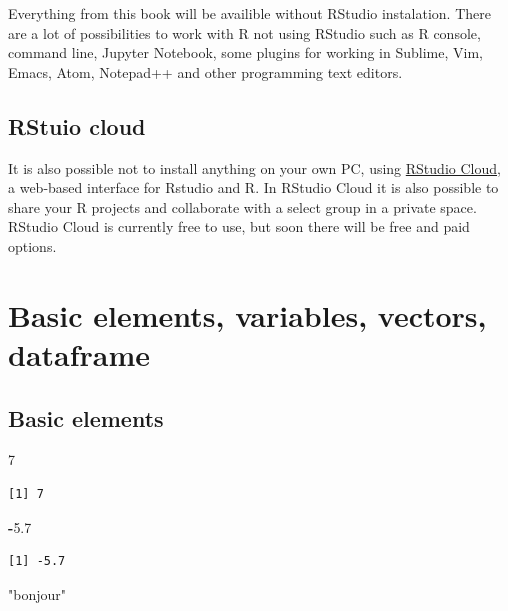 \documentclass[]{book}
\newenvironment{Shaded}{\begin{snugshade}}{\end{snugshade}}
\newcommand{\DecValTok}[1]{\textcolor[rgb]{0.00,0.00,0.81}{#1}}
\newcommand{\FloatTok}[1]{\textcolor[rgb]{0.00,0.00,0.81}{#1}}
\newcommand{\StringTok}[1]{\textcolor[rgb]{0.31,0.60,0.02}{#1}}
\newcommand{\OperatorTok}[1]{\textcolor[rgb]{0.81,0.36,0.00}{\textbf{#1}}}
\theoremstyle{definition}
\theoremstyle{definition}
\theoremstyle{definition}
\theoremstyle{remark}
\begin{document}
Everything from this book will be availible without RStudio instalation.
There are a lot of possibilities to work with R not using RStudio such
as R console, command line, Jupyter Notebook, some plugins for working
in Sublime, Vim, Emacs, Atom, Notepad++ and other programming text
editors.

\subsection{RStuio cloud}\label{rstuio-cloud}

It is also possible not to install anything on your own PC, using
\href{https://rstudio.cloud/}{RStudio Cloud}, a web-based interface for
Rstudio and R. In RStudio Cloud it is also possible to share your R
projects and collaborate with a select group in a private space. RStudio
Cloud is currently free to use, but soon there will be free and paid
options.

\section{Basic elements, variables, vectors,
dataframe}\label{basic-elements-variables-vectors-dataframe}

\subsection{Basic elements}\label{basic-elements}

\begin{Shaded}
\begin{Highlighting}[]
\DecValTok{7}
\end{Highlighting}
\end{Shaded}

\begin{verbatim}
[1] 7
\end{verbatim}

\begin{Shaded}
\begin{Highlighting}[]
\OperatorTok{-}\FloatTok{5.7}
\end{Highlighting}
\end{Shaded}

\begin{verbatim}
[1] -5.7
\end{verbatim}

\begin{Shaded}
\begin{Highlighting}[]
\StringTok{"bonjour"}
\end{Highlighting}
\end{Shaded}
\end{document}
